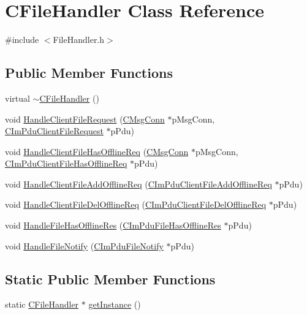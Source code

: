 \hypertarget{class_c_file_handler}{}\section{C\+File\+Handler Class Reference}
\label{class_c_file_handler}


{\ttfamily \#include $<$File\+Handler.\+h$>$}

\subsection*{Public Member Functions}
\begin{DoxyCompactItemize}
\item 
virtual \hyperlink{class_c_file_handler_a42941ca26442e67fbc5dcb31e9ee241c}{$\sim$\+C\+File\+Handler} ()
\item 
void \hyperlink{class_c_file_handler_a9669692b1e2d61144f61561561c113db}{Handle\+Client\+File\+Request} (\hyperlink{class_c_msg_conn}{C\+Msg\+Conn} $\ast$p\+Msg\+Conn, \hyperlink{class_c_im_pdu_client_file_request}{C\+Im\+Pdu\+Client\+File\+Request} $\ast$p\+Pdu)
\item 
void \hyperlink{class_c_file_handler_a1aa12d7d7d89cfccf6eabb90a05506d5}{Handle\+Client\+File\+Has\+Offline\+Req} (\hyperlink{class_c_msg_conn}{C\+Msg\+Conn} $\ast$p\+Msg\+Conn, \hyperlink{class_c_im_pdu_client_file_has_offline_req}{C\+Im\+Pdu\+Client\+File\+Has\+Offline\+Req} $\ast$p\+Pdu)
\item 
void \hyperlink{class_c_file_handler_a718cd2c43dd067ce108f43c07811e7af}{Handle\+Client\+File\+Add\+Offline\+Req} (\hyperlink{class_c_im_pdu_client_file_add_offline_req}{C\+Im\+Pdu\+Client\+File\+Add\+Offline\+Req} $\ast$p\+Pdu)
\item 
void \hyperlink{class_c_file_handler_a159ca025a7e2c40669965d80b19821b5}{Handle\+Client\+File\+Del\+Offline\+Req} (\hyperlink{class_c_im_pdu_client_file_del_offline_req}{C\+Im\+Pdu\+Client\+File\+Del\+Offline\+Req} $\ast$p\+Pdu)
\item 
void \hyperlink{class_c_file_handler_a9a801a1b6c6473779ca132be8b318f37}{Handle\+File\+Has\+Offline\+Res} (\hyperlink{class_c_im_pdu_file_has_offline_res}{C\+Im\+Pdu\+File\+Has\+Offline\+Res} $\ast$p\+Pdu)
\item 
void \hyperlink{class_c_file_handler_afbd71e9f40e81ec17c445dfdbf0acd7c}{Handle\+File\+Notify} (\hyperlink{class_c_im_pdu_file_notify}{C\+Im\+Pdu\+File\+Notify} $\ast$p\+Pdu)
\end{DoxyCompactItemize}
\subsection*{Static Public Member Functions}
\begin{DoxyCompactItemize}
\item 
static \hyperlink{class_c_file_handler}{C\+File\+Handler} $\ast$ \hyperlink{class_c_file_handler_a24c96218e81fab2d2ee011db1952c3e1}{get\+Instance} ()
\end{DoxyCompactItemize}
